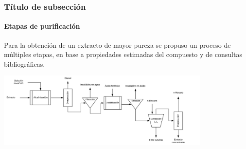 \documentclass[aspectratio=1610]{beamer}
\newcommand{\ssec}{Título de subsección}
\begin{document}
\begin{frame}
	\frametitle{\ssec}
	\framesubtitle{Etapas de purificación}
	Para la obtención de un extracto de mayor pureza se propuso un proceso de múltiples etapas,
	en base a propiedades estimadas del compuesto y de consultas bibliográficas.

	\begin{center}
	\includegraphics[width=0.8\textwidth]{figs/purificacion-propuesto.png}
	\end{center}
\end{frame}
\end{document}
